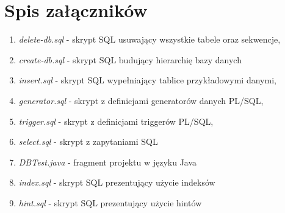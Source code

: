 \documentclass[11pt,a4paper]{article}
\begin{document}
\section*{Spis załączników}
\begin{enumerate}[label=\arabic*,ref=\arabic*]
\item \label{attach:create-db} \textit{delete-db.sql} - skrypt SQL usuwający wszystkie tabele oraz sekwencje,
\item \label{attach:delete-db} \textit{create-db.sql} - skrypt SQL budujący hierarchię bazy danych
\item \label{attach:insert} \textit{insert.sql} - skrypt SQL wypełniający tablice przykładowymi danymi,
\item \label{attach:gen} \textit{generator.sql} - skrypt z definicjami generatorów danych PL/SQL,
\item \label{attach:trigger} \textit{trigger.sql} - skrypt z definicjami triggerów PL/SQL,
\item \label{attach:select} \textit{select.sql} - skrypt z zapytaniami SQL
\item \label{attach:java} \textit{DBTest.java} - fragment projektu w języku Java
\item \label{attach:index} \textit{index.sql} - skrypt SQL prezentujący użycie indeksów
\item \label{attach:hint} \textit{hint.sql} - skrypt SQL prezentujący użycie hintów
\end{enumerate}
\end{document}
